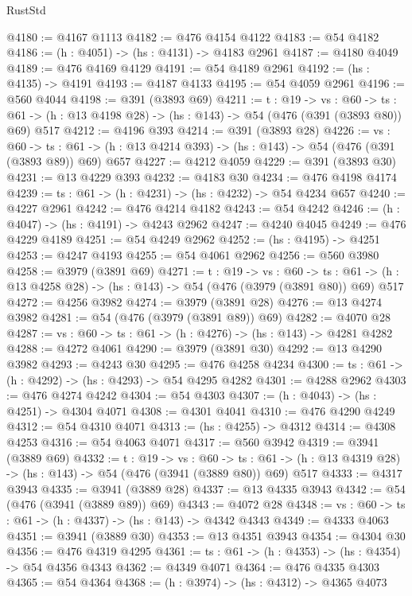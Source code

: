 \begin{lexlean}{RustStd}
\begin{coremodule}
@4180 := @4167 @1113
@4182 := @476 @4154 @4122
@4183 := @54 @4182
@4186 := (h : @4051) -> (hs : @4131) -> @4183 @2961
@4187 := @4180 @4049
@4189 := @476 @4169 @4129
@4191 := @54 @4189 @2961
@4192 := (hs : @4135) -> @4191
@4193 := @4187 @4133
@4195 := @54 @4059 @2961
@4196 := @560 @4044
@4198 := @391 (@3893 @69)
@4211 := {t : @19} ->
  {vs : @60} ->
  {ts : @61} -> (h : @13 @4198 @28) -> (hs : @143) -> @54 (@476 (@391 (@3893 @80)) @69) @517
@4212 := @4196 @393
@4214 := @391 (@3893 @28)
@4226 := {vs : @60} ->
  {ts : @61} -> (h : @13 @4214 @393) -> (hs : @143) -> @54 (@476 (@391 (@3893 @89)) @69) @657
@4227 := @4212 @4059
@4229 := @391 (@3893 @30)
@4231 := @13 @4229 @393
@4232 := @4183 @30
@4234 := @476 @4198 @4174
@4239 := {ts : @61} -> (h : @4231) -> (hs : @4232) -> @54 @4234 @657
@4240 := @4227 @2961
@4242 := @476 @4214 @4182
@4243 := @54 @4242
@4246 := (h : @4047) -> (hs : @4191) -> @4243 @2962
@4247 := @4240 @4045
@4249 := @476 @4229 @4189
@4251 := @54 @4249 @2962
@4252 := (hs : @4195) -> @4251
@4253 := @4247 @4193
@4255 := @54 @4061 @2962
@4256 := @560 @3980
@4258 := @3979 (@3891 @69)
@4271 := {t : @19} ->
  {vs : @60} ->
  {ts : @61} -> (h : @13 @4258 @28) -> (hs : @143) -> @54 (@476 (@3979 (@3891 @80)) @69) @517
@4272 := @4256 @3982
@4274 := @3979 (@3891 @28)
@4276 := @13 @4274 @3982
@4281 := @54 (@476 (@3979 (@3891 @89)) @69)
@4282 := @4070 @28
@4287 := {vs : @60} -> {ts : @61} -> (h : @4276) -> (hs : @143) -> @4281 @4282
@4288 := @4272 @4061
@4290 := @3979 (@3891 @30)
@4292 := @13 @4290 @3982
@4293 := @4243 @30
@4295 := @476 @4258 @4234
@4300 := {ts : @61} -> (h : @4292) -> (hs : @4293) -> @54 @4295 @4282
@4301 := @4288 @2962
@4303 := @476 @4274 @4242
@4304 := @54 @4303
@4307 := (h : @4043) -> (hs : @4251) -> @4304 @4071
@4308 := @4301 @4041
@4310 := @476 @4290 @4249
@4312 := @54 @4310 @4071
@4313 := (hs : @4255) -> @4312
@4314 := @4308 @4253
@4316 := @54 @4063 @4071
@4317 := @560 @3942
@4319 := @3941 (@3889 @69)
@4332 := {t : @19} ->
  {vs : @60} ->
  {ts : @61} -> (h : @13 @4319 @28) -> (hs : @143) -> @54 (@476 (@3941 (@3889 @80)) @69) @517
@4333 := @4317 @3943
@4335 := @3941 (@3889 @28)
@4337 := @13 @4335 @3943
@4342 := @54 (@476 (@3941 (@3889 @89)) @69)
@4343 := @4072 @28
@4348 := {vs : @60} -> {ts : @61} -> (h : @4337) -> (hs : @143) -> @4342 @4343
@4349 := @4333 @4063
@4351 := @3941 (@3889 @30)
@4353 := @13 @4351 @3943
@4354 := @4304 @30
@4356 := @476 @4319 @4295
@4361 := {ts : @61} -> (h : @4353) -> (hs : @4354) -> @54 @4356 @4343
@4362 := @4349 @4071
@4364 := @476 @4335 @4303
@4365 := @54 @4364
@4368 := (h : @3974) -> (hs : @4312) -> @4365 @4073

\end{coremodule}
\end{lexlean}
